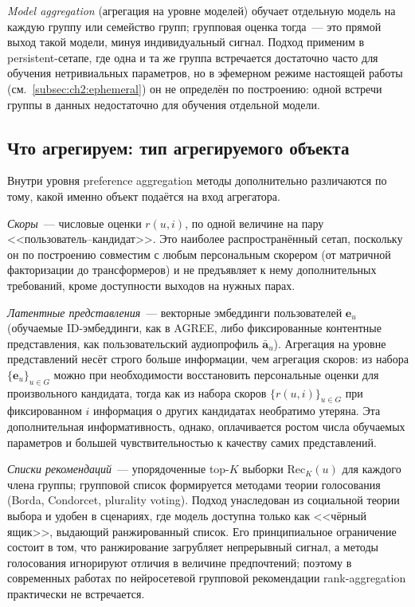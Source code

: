 \emph{Model aggregation} (агрегация на уровне моделей) обучает отдельную модель на каждую группу или семейство групп; групповая оценка тогда~--- это прямой выход такой модели, минуя индивидуальный сигнал. Подход применим в persistent-сетапе, где одна и та же группа встречается достаточно часто для обучения нетривиальных параметров, но в эфемерном режиме настоящей работы (см.~\ref{subsec:ch2:ephemeral}) он не определён по построению: одной встречи группы в данных недостаточно для обучения отдельной модели.

\subsection{Что агрегируем: тип агрегируемого объекта}
\label{subsec:ch2:tax-what}

Внутри уровня preference aggregation методы дополнительно различаются по тому, какой именно объект подаётся на вход агрегатора.

\emph{Скоры}~--- числовые оценки $r(u, i)$, по одной величине на пару <<пользователь--кандидат>>. Это наиболее распространённый сетап, поскольку он по построению совместим с любым персональным скорером (от матричной факторизации до трансформеров) и не предъявляет к нему дополнительных требований, кроме доступности выходов на нужных парах.

\emph{Латентные представления}~--- векторные эмбеддинги пользователей $\mathbf{e}_u$ (обучаемые ID-эмбеддинги, как в AGREE, либо фиксированные контентные представления, как пользовательский аудиопрофиль $\bar{\mathbf{a}}_u$). Агрегация на уровне представлений несёт строго больше информации, чем агрегация скоров: из набора $\{\mathbf{e}_u\}_{u \in G}$ можно при необходимости восстановить персональные оценки для произвольного кандидата, тогда как из набора скоров $\{r(u, i)\}_{u \in G}$ при фиксированном $i$ информация о других кандидатах необратимо утеряна. Эта дополнительная информативность, однако, оплачивается ростом числа обучаемых параметров и большей чувствительностью к качеству самих представлений.

\emph{Списки рекомендаций}~--- упорядоченные top-$K$ выборки $\mathrm{Rec}_K(u)$ для каждого члена группы; групповой список формируется методами теории голосования (Borda, Condorcet, plurality voting). Подход унаследован из социальной теории выбора и удобен в сценариях, где модель доступна только как <<чёрный ящик>>, выдающий ранжированный список. Его принципиальное ограничение состоит в том, что ранжирование загрубляет непрерывный сигнал, а методы голосования игнорируют отличия в величине предпочтений; поэтому в современных работах по нейросетевой групповой рекомендации rank-aggregation практически не встречается.

